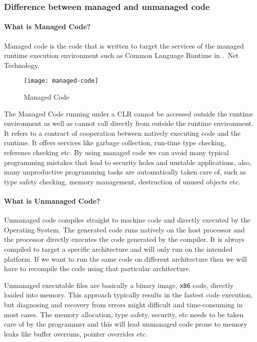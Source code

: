 \subsubsection*{Difference between managed and unmanaged code}
\paragraph*{What is Managed Code?}

Managed code is the code that is written to target the services of the managed runtime execution environment such as Common Language Runtime in .\ Net Technology.

\begin{figure}[ht!]
	\centering
	\texttt{[image: managed-code]}
	\caption[Managed Code]{Managed Code}
	\label{fig:managed-code}
\end{figure}

The Managed Code running under a CLR cannot be accessed outside the runtime environment as well as cannot call directly from outside the runtime environment. It refers to a contract of cooperation between natively executing code and the runtime. It offers services like garbage collection, run-time type checking, reference checking etc. By using managed code we can avoid many typical programming mistakes that lead to security holes and unstable applications, also, many unproductive programming tasks are automatically taken care of, such as type safety checking, memory management, destruction of unused objects etc.

\paragraph*{What is Unmanaged Code?}
Unmanaged code compiles straight to machine code and directly executed by the Operating System. The generated code runs natively on the host processor and the processor directly executes the code generated by the compiler. It is always compiled to target a specific architecture and will only run on the intended platform. If we want to run the same code on different architecture then we will have to recompile the code using that particular architecture.

Unmanaged executable files are basically a binary image, \texttt{x86} code, directly loaded into memory. This approach typically results in the fastest code execution, but diagnosing and recovery from errors might difficult and time-consuming in most cases. The memory allocation, type safety, security, etc needs to be taken care of by the programmer and this will lead unmanaged code prone to memory leaks like buffer overruns, pointer overrides etc.

